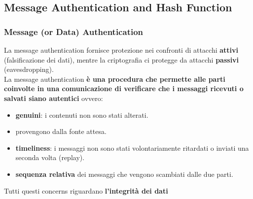 \documentclass[12pt]{article}
\begin{document}
	\subsection{Message Authentication and Hash Function}
		\subsubsection{Message (or Data) Authentication}
			La message authentication fornisce protezione nei confronti di attacchi \textbf{attivi} (falsificazione dei dati), mentre la criptografia ci protegge da attacchi \textbf{passivi} (eavesdropping).\\
			La message authentication \textbf{è una procedura che permette alle parti coinvolte in una comunicazione di verificare che i messaggi ricevuti o salvati siano autentici} ovvero: 
			\begin{itemize}
				\item \textbf{genuini}: i contenuti non sono stati alterati.
				\item provengono dalla fonte attesa.
				\item \textbf{timeliness}: i messaggi non sono stati volontariamente ritardati o inviati una seconda volta (replay).
				\item \textbf{sequenza relativa} dei messaggi che vengono scambiati dalle due parti.
			\end{itemize}
			Tutti questi concerns riguardano \textbf{l'integrità dei dati}
\end{document}
